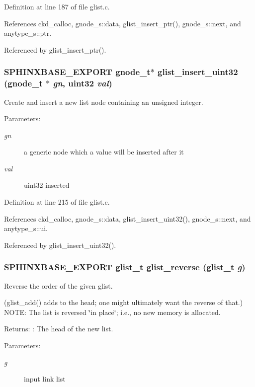 Definition at line 187 of file glist.c.

References ckd\_\-calloc, gnode\_\-s::data, glist\_\-insert\_\-ptr(), gnode\_\-s::next, and anytype\_\-s::ptr.

Referenced by glist\_\-insert\_\-ptr().
\subsubsection[{glist\_\-insert\_\-uint32}]{\setlength{\rightskip}{0pt plus 5cm}SPHINXBASE\_\-EXPORT {\bf gnode\_\-t}$\ast$ glist\_\-insert\_\-uint32 ({\bf gnode\_\-t} $\ast$ {\em gn}, \/  uint32 {\em val})}\label{glist_8h_b7e58ee641d3648f047eef70a20a4647}


Create and insert a new list node containing an unsigned integer. 

\begin{Desc}
\item[Parameters: ]\par
\begin{description}
\item[{\em 
gn}]a generic node which a value will be inserted after it \item[{\em 
val}]uint32 inserted \end{description}
\end{Desc}


Definition at line 215 of file glist.c.

References ckd\_\-calloc, gnode\_\-s::data, glist\_\-insert\_\-uint32(), gnode\_\-s::next, and anytype\_\-s::ui.

Referenced by glist\_\-insert\_\-uint32().
\subsubsection[{glist\_\-reverse}]{\setlength{\rightskip}{0pt plus 5cm}SPHINXBASE\_\-EXPORT {\bf glist\_\-t} glist\_\-reverse ({\bf glist\_\-t} {\em g})}\label{glist_8h_399a2a093c6c4ce1012762e4c25c8185}


Reverse the order of the given glist. 

(glist\_\-add() adds to the head; one might ultimately want the reverse of that.) NOTE: The list is reversed \char`\"{}in place\char`\"{}; i.e., no new memory is allocated. \begin{Desc}
\item[Returns:]: The head of the new list. \end{Desc}
\begin{Desc}
\item[Parameters: ]\par
\begin{description}
\item[{\em 
g}]input link list \end{description}
\end{Desc}


